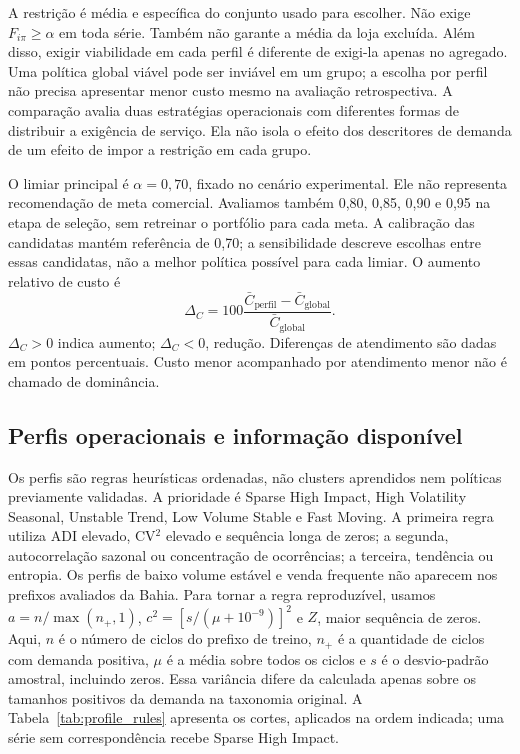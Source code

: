 \documentclass[preprint,12pt]{elsarticle}
\begin{document}
A restrição é média e específica do conjunto usado para escolher. Não exige $F_{i\pi}\geq\alpha$ em toda série. Também não garante a média da loja excluída. Além disso, exigir viabilidade em cada perfil é diferente de exigi-la apenas no agregado. Uma política global viável pode ser inviável em um grupo; a escolha por perfil não precisa apresentar menor custo mesmo na avaliação retrospectiva. A comparação avalia duas estratégias operacionais com diferentes formas de distribuir a exigência de serviço. Ela não isola o efeito dos descritores de demanda de um efeito de impor a restrição em cada grupo.

O limiar principal é $\alpha=0{,}70$, fixado no cenário experimental. Ele não representa recomendação de meta comercial. Avaliamos também 0,80, 0,85, 0,90 e 0,95 na etapa de seleção, sem retreinar o portfólio para cada meta. A calibração das candidatas mantém referência de 0,70; a sensibilidade descreve escolhas entre essas candidatas, não a melhor política possível para cada limiar. O aumento relativo de custo é
\begin{equation}
 \Delta_C=100\frac{\bar C_{\mathrm{perfil}}-\bar C_{\mathrm{global}}}{\bar C_{\mathrm{global}}}.
\end{equation}
$\Delta_C>0$ indica aumento; $\Delta_C<0$, redução. Diferenças de atendimento são dadas em pontos percentuais. Custo menor acompanhado por atendimento menor não é chamado de dominância.

\subsection{Perfis operacionais e informação disponível}
Os perfis são regras heurísticas ordenadas, não clusters aprendidos nem políticas previamente validadas. A prioridade é Sparse High Impact, High Volatility Seasonal, Unstable Trend, Low Volume Stable e Fast Moving. A primeira regra utiliza ADI elevado, CV$^2$ elevado e sequência longa de zeros; a segunda, autocorrelação sazonal ou concentração de ocorrências; a terceira, tendência ou entropia. Os perfis de baixo volume estável e venda frequente não aparecem nos prefixos avaliados da Bahia. Para tornar a regra reproduzível, usamos $a=n/\max(n_+,1)$, $c^2=[s/(\mu+10^{-9})]^2$ e $Z$, maior sequência de zeros. Aqui, $n$ é o número de ciclos do prefixo de treino, $n_+$ é a quantidade de ciclos com demanda positiva, $\mu$ é a média sobre todos os ciclos e $s$ é o desvio-padrão amostral, incluindo zeros. Essa variância difere da calculada apenas sobre os tamanhos positivos da demanda na taxonomia original. A Tabela~\ref{tab:profile_rules} apresenta os cortes, aplicados na ordem indicada; uma série sem correspondência recebe Sparse High Impact.
\end{document}
